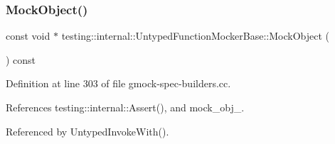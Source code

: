 \subsubsection{\texorpdfstring{Mock\+Object()}{MockObject()}}
{\footnotesize\ttfamily const void $\ast$ testing\+::internal\+::\+Untyped\+Function\+Mocker\+Base\+::\+Mock\+Object (\begin{DoxyParamCaption}{ }\end{DoxyParamCaption}) const}



Definition at line 303 of file gmock-\/spec-\/builders.\+cc.



References testing\+::internal\+::\+Assert(), and mock\+\_\+obj\+\_\+.



Referenced by Untyped\+Invoke\+With().


